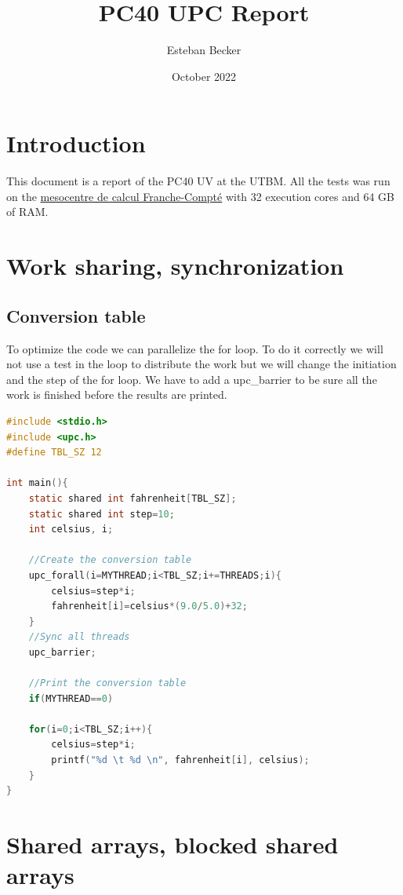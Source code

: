 \documentclass{report}
\title{PC40 UPC Report}
\author{Esteban Becker}
\date{October 2022}
\begin{document}
\maketitle

\tableofcontents

\chapter{Introduction}

This document is a report of the PC40 UV at the UTBM. \newline
All the tests was run on the \href{https://www.univ-fcomte.fr/informatique-calcul/mesocentre-de-calcul}{mesocentre de calcul Franche-Compté} with 32 execution cores and 64 GB of RAM.

\chapter{Work sharing, synchronization}

\section{Conversion table}

To optimize the code we can parallelize the for loop. To do it correctly we will not use a test in the loop to distribute the work but we will change the initiation and the step of the for loop.\newline
We have to add a upc\_barrier to be sure all the work is finished before the results are printed.

\begin{lstlisting}[language=C]
#include <stdio.h>
#include <upc.h>
#define TBL_SZ 12

int main(){
    static shared int fahrenheit[TBL_SZ];
    static shared int step=10; 
    int celsius, i;

    //Create the conversion table
    upc_forall(i=MYTHREAD;i<TBL_SZ;i+=THREADS;i){
        celsius=step*i;
        fahrenheit[i]=celsius*(9.0/5.0)+32;
    }
    //Sync all threads
    upc_barrier;

    //Print the conversion table
    if(MYTHREAD==0)

    for(i=0;i<TBL_SZ;i++){
        celsius=step*i;
        printf("%d \t %d \n", fahrenheit[i], celsius);
    }
}

\end{lstlisting}


\chapter{Shared arrays, blocked shared arrays}
\end{document}
